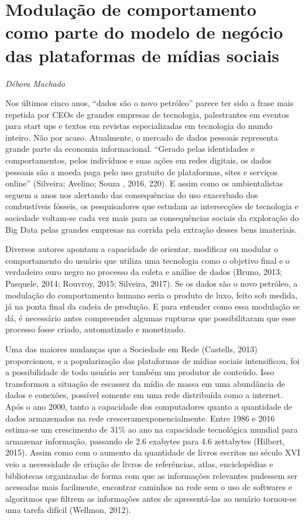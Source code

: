 \chapter{Modulação de comportamento como parte do modelo de negócio das
plataformas de mídias sociais}

\begin{flushright}
\emph{Débora Machado}
\end{flushright}

Nos últimos cinco anos, ``dados são o novo petróleo'' parece ter sido a
frase mais repetida por CEOs de grandes empresas de tecnologia,
palestrantes em eventos para start ups e textos em revistas
especializadas em tecnologia do mundo inteiro. Não por acaso.
Atualmente, o mercado de dados pessoais representa grande parte da
economia informacional. ``Gerado pelas identidades e comportamentos,
pelos indivíduos e suas ações em redes digitais, os dados pessoais são a
moeda paga pelo uso gratuito de plataformas, sites e serviços online''
(Silveira; Avelino; Souza , 2016, 220). E assim como os ambientalistas
seguem a anos nos alertando das consequências do uso exacerbado dos
combustíveis fósseis, os pesquisadores que estudam as intersecções de
tecnologia e sociedade voltam-se cada vez mais para as consequências
sociais da exploração do Big Data pelas grandes empresas na corrida pela
extração desses bens imateriais.

Diversos autores apontam a capacidade de orientar, modificar ou modular
o comportamento do usuário que utiliza uma tecnologia como o objetivo
final e o verdadeiro ouro negro no processo da coleta e análise de dados
(Bruno, 2013; Pasquele, 2014; Rouvroy, 2015; Silveira, 2017). Se os
dados são o novo petróleo, a modulação do comportamento humano seria o
produto de luxo, feito sob medida, já na ponta final da cadeia de
produção. E para entender como essa modulação se dá, é necessário antes
compreender algumas rupturas que possibilitaram que esse processo fosse
criado, automatizado e monetizado.

Uma das maiores mudanças que a Sociedade em Rede (Castells, 2013)
proporcionou, e a popularização das plataformas de mídias sociais
intensificou, foi a possibilidade de todo usuário ser também um produtor
de conteúdo. Isso transformou a situação de escassez da mídia de massa
em uma abundância de dados e conexões, possível somente em uma rede
distribuída como a internet. Após o ano 2000, tanto a capacidade dos
computadores quanto a quantidade de dados armazenados na rede
cresceramexponencialmente. Entre 1986 e 2016 estima-se um crescimento de
31\% ao ano na capacidade tecnológica mundial para armazenar informação,
passando de 2.6 exabytes para 4.6 zettabytes (Hilbert, 2015). Assim como
com o aumento da quantidade de livros escritos no século XVI veio a
necessidade de criação de livros de referências, atlas, enciclopédias e
bibliotecas organizadas de forma com que as informações relevantes
pudessem ser acessadas mais facilmente, encontrar caminhos na rede sem o
uso de softwares e algoritmos que filtrem as informações antes de
apresentá-las ao usuário tornou-se uma tarefa difícil (Wellmon, 2012).

